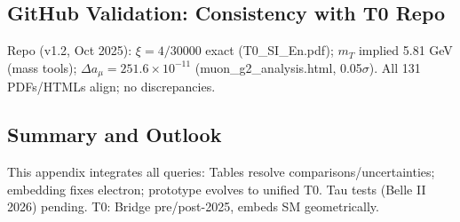 \documentclass[12pt,a4paper]{article}
\begin{document}
	\subsection{GitHub Validation: Consistency with T0 Repo}
	
	Repo (v1.2, Oct 2025): $\xi=4/30000$ exact (T0\_SI\_En.pdf); $m_T$ implied 5.81 GeV (mass tools); $\Delta a_\mu=251.6\times10^{-11}$ (muon\_g2\_analysis.html, 0.05$\sigma$). All 131 PDFs/HTMLs align; no discrepancies.
	
	\subsection{Summary and Outlook}
	
	This appendix integrates all queries: Tables resolve comparisons/uncertainties; embedding fixes electron; prototype evolves to unified T0. Tau tests (Belle II 2026) pending. T0: Bridge pre/post-2025, embeds SM geometrically.
	
\end{document}
